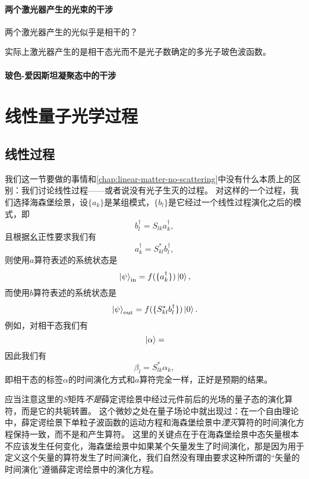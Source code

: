 \subsubsection{两个激光器产生的光束的干涉}

两个激光器产生的光似乎是相干的？

实际上激光器产生的是相干态光而不是光子数确定的多光子玻色波函数。

\subsubsection{玻色-爱因斯坦凝聚态中的干涉}

\chapter{线性量子光学过程}

\section{线性过程}

我们这一节要做的事情和\autoref{chap:linear-matter-no-scattering}中没有什么本质上的区别：我们讨论线性过程——或者说没有光子生灭的过程。
对这样的一个过程，我们选择海森堡绘景，设$\{a_k\}$是某组模式，$\{b_l \}$是它经过一个线性过程演化之后的模式，即\begin{equation}
    b_l^\dagger = S_{lk} a^\dagger_k,
\end{equation}
且根据幺正性要求我们有
\begin{equation}
    a_k^\dagger = S_{kl}^* b^\dagger_l,
\end{equation}
则使用$a$算符表述的系统状态是
\begin{equation}
    \ket*{\psi}_\text{in} = f(\{ a_k^\dagger \}) \ket*{0},
\end{equation}
而使用$b$算符表述的系统状态是
\begin{equation}
    \ket*{\psi}_\text{out} = f(\{ S_{kl}^* b_l^\dagger \}) \ket*{0}.
\end{equation}
例如，对相干态我们有
\begin{equation}
    \ket*{\alpha} = 
\end{equation}
因此我们有
\begin{equation}
    \beta_l = S_{lk}^* \alpha_k ,
\end{equation}
即相干态的标签$\alpha$的时间演化方式和$a$算符完全一样，正好是预期的结果。

应当注意这里的$S$矩阵\emph{不是}薛定谔绘景中经过元件前后的光场的量子态的演化算符，而是它的共轭转置。
这个微妙之处在量子场论中就出现过：在一个自由理论中，薛定谔绘景下单粒子波函数的运动方程和海森堡绘景中\emph{湮灭}算符的时间演化方程保持一致，而不是和产生算符。
这里的关键点在于在海森堡绘景中态矢量根本不应该发生任何变化，海森堡绘景中如果某个矢量发生了时间演化，那是因为用于定义这个矢量的算符发生了时间演化，我们自然没有理由要求这种所谓的“矢量的时间演化”遵循薛定谔绘景中的演化方程。

